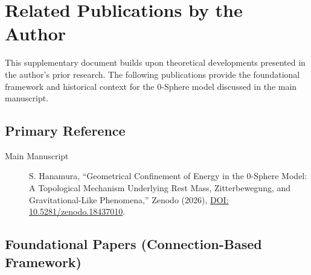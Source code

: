 \documentclass[12pt,letterpaper]{article}
\begin{document}

\section*{Related Publications by the Author}

This supplementary document builds upon theoretical developments presented in the author's prior research. The following publications provide the foundational framework and historical context for the 0-Sphere model discussed in the main manuscript.


\subsection*{Primary Reference}

\begin{description}
\item[Main Manuscript] S. Hanamura, ``Geometrical Confinement of Energy in the 0-Sphere Model: A Topological Mechanism Underlying Rest Mass, Zitterbewegung, and Gravitational-Like Phenomena,'' Zenodo (2026), \href{https://doi.org/10.5281/zenodo.18437010}{DOI: 10.5281/zenodo.18437010}.
\end{description}


\subsection*{Foundational Papers (Connection-Based Framework)}
\end{document}
